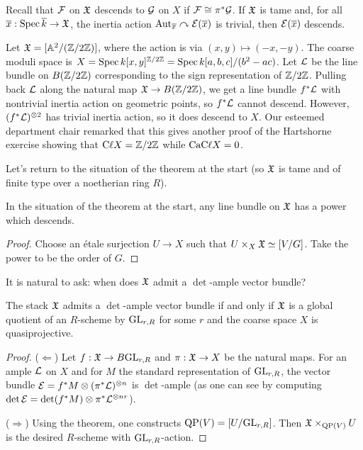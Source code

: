 \documentclass{amsart}
\begin{document}
Recall that $\mathcal{F}$ on $\mathfrak{X}$ descends to $\mathcal{G}$ on $X$ if $\mathcal{F} \cong \pi^* \mathcal{G}$.
If $\mathfrak{X}$ is tame and, for all $\overline{x}: \operatorname{Spec} \overline{k} \to \mathfrak{X}$, the inertia action $\operatorname{Aut}_{\overline{x}} \curvearrowright \mathcal{E}(\overline{x})$ is trivial, then $\mathcal{E}(\overline{x})$ descends.

\begin{ex}
	Let $\mathfrak{X} = [\mathbb{A}^2 / (\mathbb{Z} / 2\mathbb{Z})]$, where the action is via $(x, y) \mapsto (-x, -y)$.
	The coarse moduli space is $X = \operatorname{Spec} k[x, y]^{\mathbb{Z} / 2 \mathbb{Z}} = \operatorname{Spec} k[a, b, c] / (b^2 - ac)$.
	Let $\mathcal{L}$ be the line bundle on $B(\mathbb{Z} / 2 \mathbb{Z})$ corresponding to the sign representation of $\mathbb{Z} / 2 \mathbb{Z}$.
	Pulling back $\mathcal{L}$ along the natural map $\mathfrak{X} \to B(\mathbb{Z} / 2 \mathbb{Z})$, we get a line bundle $f^* \mathcal{L}$ with nontrivial inertia action on geometric points, so $f^* \mathcal{L}$ cannot descend.
	However, $(f^* \mathcal{L})^{\otimes 2}$ has trivial inertia action, so it does descend to $X$.
	Our esteemed department chair remarked that this gives another proof of the Hartshorne exercise showing that $\mathrm{C\ell} X = \mathbb{Z} / 2 \mathbb{Z}$ while $\mathrm{CaC\ell} X = 0$.
\end{ex}

Let's return to the situation of the theorem at the start (so $\mathfrak{X}$ is tame and of finite type over a noetherian ring $R$).

\begin{prop}
	In the situation of the theorem at the start, any line bundle on $\mathfrak{X}$ has a power which descends.
\end{prop}

\begin{proof}
	Choose an \'etale surjection $U \to X$ such that $U \times_X \mathfrak{X} \simeq [V / G]$.
	Take the power to be the order of $G$.
\end{proof}

It is natural to ask: when does $\mathfrak{X}$ admit a $\det$-ample vector bundle?

\begin{prop}
	The stack $\mathfrak{X}$ admits a $\det$-ample vector bundle if and only if $\mathfrak{X}$ is a global quotient of an $R$-scheme by $\mathrm{GL}_{r,R}$ for some $r$ and the coarse space $X$ is quasiprojective.
\end{prop}

\begin{proof}
	($\Leftarrow$) Let $f: \mathfrak{X} \to B\mathrm{GL}_{r,R}$ and $\pi: \mathfrak{X} \to X$ be the natural maps.
	For an ample $\mathcal{L}$ on $X$ and for $M$ the standard representation of $\mathrm{GL}_{r,R}$, the vector bundle $\mathcal{E} = f^* M \otimes (\pi^* \mathcal{L})^{\otimes n}$ is $\det$-ample (as one can see by computing $\det \mathcal{E} = \det (f^* M) \otimes \pi^* \mathcal{L}^{\otimes n r}$).

	($\Rightarrow$) Using the theorem, one constructs $\mathrm{QP}(V) = [U / \mathrm{GL}_{r,R}]$.
	Then $\mathfrak{X} \times_{\mathrm{QP}(V)} U$ is the desired $R$-scheme with $\mathrm{GL}_{r,R}$-action.
\end{proof}
\end{document}
